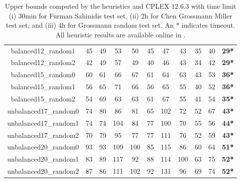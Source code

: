 \begin{table}
\begin{adjustbox}{center}
\begin{tabular}{|ccccccccccc|}
balanced12\_random1 & 45 & 49 & 53 & 50 & 45 & 47 & 43 & 35 & 40 & \textbf{29*} \\ 
balanced12\_random2 & 42 & 49 & 57 & 49 & 40 & 46 & 43 & 34 & 42 & \textbf{29*} \\ 
balanced15\_random0 & 60 & 61 & 66 & 67 & 61 & 64 & 63 & 43 & 53 & \textbf{36*} \\ 
balanced15\_random1 & 56 & 65 & 71 & 66 & 56 & 65 & 55 & 40 & 52 & \textbf{36*} \\ 
balanced15\_random2 & 54 & 69 & 63 & 63 & 61 & 67 & 55 & 41 & 54 & \textbf{35*} \\ 
unbalanced17\_random0 & 74 & 80 & 86 & 81 & 65 & 102 & 72 & 52 & 67 & \textbf{43*} \\ 
unbalanced17\_random1 & 74 & 74 & 104 & 84 & 77 & 100 & 70 & 55 & 56 & \textbf{44*} \\ 
unbalanced17\_random2 & 70 & 79 & 95 & 77 & 77 & 111 & 76 & 52 & 59 & \textbf{43*} \\ 
unbalanced20\_random0 & 93 & 93 & 109 & 100 & 85 & 115 & 86 & 60 & 64 & \textbf{51*} \\ 
unbalanced20\_random1 & 83 & 89 & 117 & 92 & 88 & 114 & 100 & 63 & 75 & \textbf{52*} \\ 
unbalanced20\_random2 & 87 & 86 & 111 & 102 & 92 & 131 & 96 & 69 & 74 & \textbf{52*} \\ 
\hline 
\end{tabular} 
\end{adjustbox} 
\vspace*{-0.2cm} 
\caption{Upper bounds computed by the heuristics and CPLEX 12.6.3 with time limit (i) 30min for Furman Sahinidis test set, (ii) 2h for Chen Grossmann Miller test set, and (iii) 4h for Grossmann random test set. An * indicates timeout. All heuristic results are available online in \cite{source_code}.} 
\label{Table:Heuristic_Upper_Bounds} 
\end{table} 
